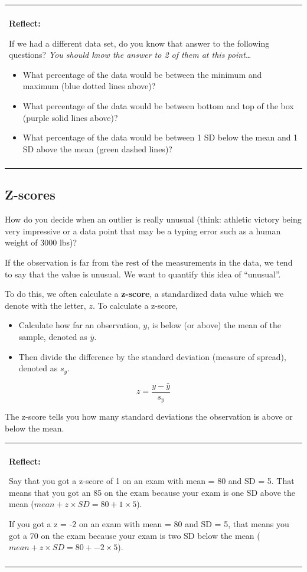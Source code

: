 \documentclass[
]{book}
\providecommand{\tightlist}{%
  \setlength{\itemsep}{0pt}\setlength{\parskip}{0pt}}
\newenvironment{reflect}
{
    \begin{center}
    
    \begin{tabular}{|p{0.8\textwidth}|}
    \rowcolor{LightBlue}
    \hline\\
    \rowcolor{LightBlue}
    \textbf{Reflect:}
}
{
    \\\rowcolor{LightBlue}
    \\\hline
    \end{tabular} 
    \end{center}
}
\begin{document}
\begin{reflect}
If we had a different data set, do you know that answer to the following
questions? \emph{You should know the answer to 2 of them at this
point\ldots{}}

\begin{itemize}
\item
  What percentage of the data would be between the minimum and maximum
  (blue dotted lines above)?
\item
  What percentage of the data would be between bottom and top of the box
  (purple solid lines above)?
\item
  What percentage of the data would be between 1 SD below the mean and 1
  SD above the mean (green dashed lines)?
\end{itemize}
\end{reflect}

\hypertarget{z-scores}{%
\subsection{Z-scores}\label{z-scores}}

How do you decide when an outlier is really unusual (think: athletic victory being very impressive or a data point that may be a typing error such as a human weight of 3000 lbs)?

If the observation is far from the rest of the measurements in the data, we tend to say that the value is unusual. We want to quantify this idea of ``unusual''.

To do this, we often calculate a \textbf{z-score}, a standardized data value which we denote with the letter, \(z\). To calculate a z-score,

\begin{itemize}
\tightlist
\item
  Calculate how far an observation, \(y\), is below (or above) the mean of the sample, denoted as \(\bar{y}\).
\item
  Then divide the difference by the standard deviation (measure of spread), denoted as \(s_y\).
\end{itemize}

\[ z = \frac{y - \bar{y}}{s_y} \]

The z-score tells you how many standard deviations the observation is above or below the mean.

\begin{reflect}
Say that you got a z-score of 1 on an exam with mean = 80 and SD = 5.
That means that you got an 85 on the exam because your exam is one SD
above the mean (\(mean + z \times SD = 80 + 1 \times 5\)).

If you got a z = -2 on an exam with mean = 80 and SD = 5, that means you
got a 70 on the exam because your exam is two SD below the mean
(\(mean + z \times SD = 80 + -2 \times 5\)).
\end{reflect}
\end{document}

